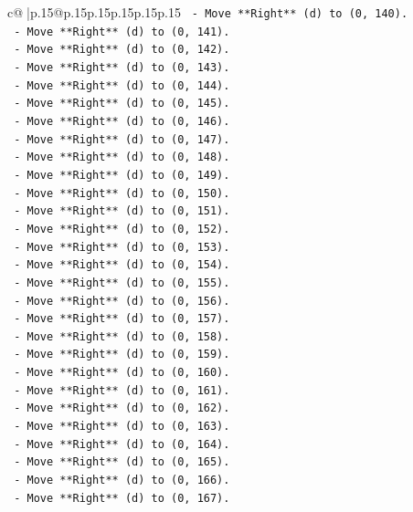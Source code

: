 \documentclass{article}
\begin{document}
{\begin{supertabular}{c@{$\;$}|p{.15\linewidth}@{}p{.15\linewidth}p{.15\linewidth}p{.15\linewidth}p{.15\linewidth}p{.15\linewidth}}
{{{\texttt{        {-} Move **Right** (d) to (0, 140).} \\
\texttt{        {-} Move **Right** (d) to (0, 141).} \\
\texttt{        {-} Move **Right** (d) to (0, 142).} \\
\texttt{        {-} Move **Right** (d) to (0, 143).} \\
\texttt{        {-} Move **Right** (d) to (0, 144).} \\
\texttt{        {-} Move **Right** (d) to (0, 145).} \\
\texttt{        {-} Move **Right** (d) to (0, 146).} \\
\texttt{        {-} Move **Right** (d) to (0, 147).} \\
\texttt{        {-} Move **Right** (d) to (0, 148).} \\
\texttt{        {-} Move **Right** (d) to (0, 149).} \\
\texttt{        {-} Move **Right** (d) to (0, 150).} \\
\texttt{        {-} Move **Right** (d) to (0, 151).} \\
\texttt{        {-} Move **Right** (d) to (0, 152).} \\
\texttt{        {-} Move **Right** (d) to (0, 153).} \\
\texttt{        {-} Move **Right** (d) to (0, 154).} \\
\texttt{        {-} Move **Right** (d) to (0, 155).} \\
\texttt{        {-} Move **Right** (d) to (0, 156).} \\
\texttt{        {-} Move **Right** (d) to (0, 157).} \\
\texttt{        {-} Move **Right** (d) to (0, 158).} \\
\texttt{        {-} Move **Right** (d) to (0, 159).} \\
\texttt{        {-} Move **Right** (d) to (0, 160).} \\
\texttt{        {-} Move **Right** (d) to (0, 161).} \\
\texttt{        {-} Move **Right** (d) to (0, 162).} \\
\texttt{        {-} Move **Right** (d) to (0, 163).} \\
\texttt{        {-} Move **Right** (d) to (0, 164).} \\
\texttt{        {-} Move **Right** (d) to (0, 165).} \\
\texttt{        {-} Move **Right** (d) to (0, 166).} \\
\texttt{        {-} Move **Right** (d) to (0, 167).} \\
}}}
\end{supertabular}}
\end{document}
